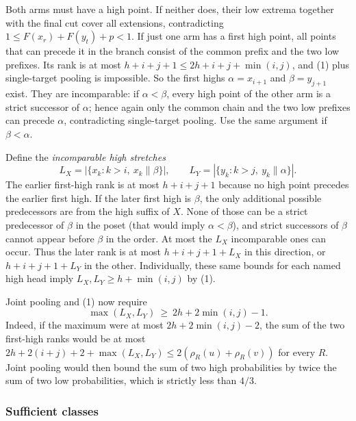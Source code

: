 \documentclass[
  11pt,
]{article}
\begin{document}
Both arms must have a high point. If neither does, their low extrema
together with the final cut cover all extensions, contradicting
\(1\le F(x_r)+F(y_t)+p<1\). If just one arm has a first high point, all
points that can precede it in the branch consist of the common prefix
and the two low prefixes. Its rank is at most
\(h+i+j+1\le2h+i+j+\min(i,j)\), and (1) plus single-target pooling is
impossible. So the first highs \(\alpha=x_{i+1}\) and \(\beta=y_{j+1}\)
exist. They are incomparable: if \(\alpha<\beta\), every high point of
the other arm is a strict successor of \(\alpha\); hence again only the
common chain and the two low prefixes can precede \(\alpha\),
contradicting single-target pooling. Use the same argument if
\(\beta<\alpha\).

Define the \emph{incomparable high stretches} \[
 L_X=|\{x_k:k>i,\ x_k\parallel\beta\}|,\qquad
 L_Y=|\{y_k:k>j,\ y_k\parallel\alpha\}|.
\] The earlier first-high rank is at most \(h+i+j+1\) because no high
point precedes the earlier first high. If the later first high is
\(\beta\), the only additional possible predecessors are from the high
suffix of \(X\). None of those can be a strict predecessor of \(\beta\)
in the poset (that would imply \(\alpha<\beta\)), and strict successors
of \(\beta\) cannot appear before \(\beta\) in the order. At most the
\(L_X\) incomparable ones can occur. Thus the later rank is at most
\(h+i+j+1+L_X\) in this direction, or \(h+i+j+1+L_Y\) in the other.
Individually, these same bounds for each named high head imply
\(L_X,L_Y\ge h+\min(i,j)\) by (1).

Joint pooling and (1) now require \[
 \boxed{\max(L_X,L_Y)\ \ge\ 2h+2\min(i,j)-1.}                  \tag{2}
\] Indeed, if the maximum were at most \(2h+2\min(i,j)-2\), the sum of
the two first-high ranks would be at most
\(2h+2(i+j)+2+\max(L_X,L_Y)\le 2(\rho_R(u)+\rho_R(v))\) for every \(R\).
Joint pooling would then bound the sum of two high probabilities by
twice the sum of two low probabilities, which is strictly less than
\(4/3\).

\subsubsection{Sufficient classes}\label{sufficient-classes}
\end{document}
